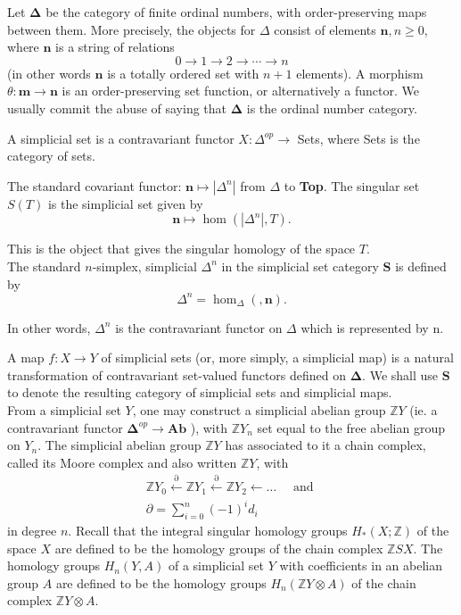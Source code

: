 Let $\mathbf{\Delta}$ be the category of finite ordinal numbers, with order-preserving maps between them. More precisely, the objects for $\Delta$ consist of elements $\mathbf{n}, n \geq 0$, where $\mathbf{n}$ is a string of relations
$$
0 \rightarrow 1 \rightarrow 2 \rightarrow \cdots \rightarrow n
$$
(in other words $\mathbf{n}$ is a totally ordered set with $n+1$ elements). A morphism $\theta: \mathbf{m} \rightarrow \mathbf{n}$ is an order-preserving set function, or alternatively a functor. We usually commit the abuse of saying that $\mathbf{\Delta}$ is the ordinal number category.

A simplicial set is a contravariant functor $X: \Delta^{o p} \rightarrow$ Sets, where Sets is the category of sets.

\begin{rema}
    The standard covariant functor: $\mathbf{n} \mapsto |\Delta^n| $ from $\Delta$ to \textbf{Top}. The singular set $S(T)$ is the simplicial set given by
    $$
    \mathbf{n} \mapsto \operatorname{hom}\left(\left|\Delta^n\right|, T\right) .
    $$
    
    This is the object that gives the singular homology of the space $T$.\\

    The standard $n$-simplex, simplicial $\Delta^n$ in the simplicial set category $\mathbf{S}$ is defined by
$$
\Delta^n=\operatorname{hom}_{\Delta}(, \mathbf{n}) .
$$

In other words, $\Delta^n$ is the contravariant functor on $\Delta$ which is represented by n.
\end{rema}

A map $f: X \rightarrow Y$ of simplicial sets (or, more simply, a simplicial map) is a natural transformation of contravariant set-valued functors defined on $\boldsymbol{\Delta}$. We shall use $\mathbf{S}$ to denote the resulting category of simplicial sets and simplicial maps.\\

From a simplicial set $Y$, one may construct a simplicial abelian group $\mathbb{Z} Y$ (ie. a contravariant functor $\boldsymbol{\Delta}^{o p} \rightarrow \mathbf{A b}$ ), with $\mathbb{Z} Y_n$ set equal to the free abelian group on $Y_n$. The simplicial abelian group $\mathbb{Z} Y$ has associated to it a chain complex, called its Moore complex and also written $\mathbb{Z} Y$, with
$$
\begin{gathered}
\mathbb{Z} Y_0 \stackrel{\partial}{\leftarrow} \mathbb{Z} Y_1 \stackrel{\partial}{\leftarrow} \mathbb{Z} Y_2 \leftarrow \ldots \quad \text { and } \\
\partial=\sum_{i=0}^n(-1)^i d_i
\end{gathered}
$$
in degree $n$. Recall that the integral singular homology groups $H_*(X ; \mathbb{Z})$ of the space $X$ are defined to be the homology groups of the chain complex $\mathbb{Z} S X$. The homology groups $H_n(Y, A)$ of a simplicial set $Y$ with coefficients in an abelian group $A$ are defined to be the homology groups $H_n(\mathbb{Z} Y \otimes A)$ of the chain complex $\mathbb{Z} Y \otimes A$.



